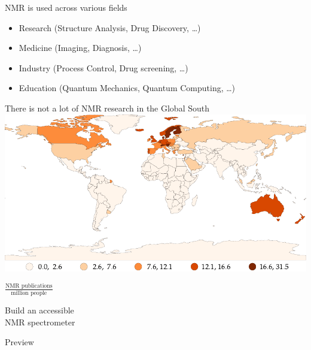 \documentclass{ethpresentation}
\begin{document}
\begin{frame}{NMR is used across various fields}
  \begin{itemize}[<+->]
    \item Research (Structure Analysis, Drug Discovery, \ldots)
    \item Medicine (Imaging, Diagnosis, \ldots)
    \item Industry (Process Control, Drug screening, \dots)
    \item Education (Quantum Mechanics, Quantum Computing, \ldots)
  \end{itemize}
\end{frame}

\begin{frame}{There is not a lot of NMR research in the Global South}
  \centering
  \includegraphics[height=0.8\textheight]{images/nmr-affiliations-per-million-people_naturalbreaks.pdf}

  \(\frac{\text{NMR publications}}{\text{million people}}\)
\end{frame}

\begin{frame}[standout]
  \centering
  Build an accessible\\NMR spectrometer
\end{frame}

\begin{frame}{Preview}
  \tableofcontents
\end{frame}
\end{document}
